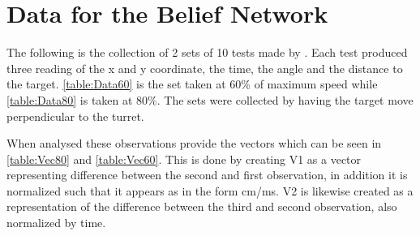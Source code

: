 \chapter{Data for the Belief Network}\label{AppendixMIData}
The following is the collection of 2 sets of 10 tests made by \name. Each test
produced three reading of the x and y coordinate, the time, the angle and the
distance to the target. \autoref{table:Data60} is the set taken at 60\% of
maximum speed while \autoref{table:Data80} is taken at 80\%. The sets were
collected by having the target move perpendicular to the turret.

When analysed these observations provide the vectors which can be seen in
\autoref{table:Vec80} and \autoref{table:Vec60}. This is done by creating V1 as
a vector representing difference between the second and first observation, in
addition it is normalized such that it appears as in the form cm/ms. V2 is
likewise created as a representation of the difference between the third and
second observation, also normalized by time.


